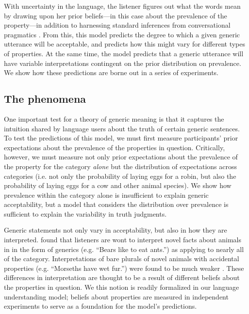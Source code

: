 \documentclass[10pt,letterpaper]{article}
\begin{document}
With uncertainty in the language, the listener figures out what the words mean by drawing upon her prior beliefs---in this case about the prevalence of the property---in addition to harnessing standard inferences from conversational pragmatics \cite{Clark1996, Grice1975, Levinson2000}. From this, this model predicts the degree to which a given generic utterance will be acceptable, and predicts how this might vary for different types of properties. At the same time, the model predicts that a generic utterance will have variable interpretations contingent on the prior distribution on prevalence. 
We show how these predictions are borne out in a series of experiments.
%
\subsection{The phenomena}

One important test for a theory of generic meaning is that it captures the intuition shared by language users about the truth of certain generic sentences. To test the predictions of this model, we must first measure participants' prior expectations about the prevalence of the properties in question. Critically, however, we must measure not only prior expectations about the prevalence of the property for the category \emph{alone} but the distribution of expectations across categories (i.e. not only the probability of laying eggs for a robin, but also the probability of laying eggs for a cow and other animal species).  
We show how prevalence within the category alone is insufficient to explain generic acceptability, but a model that considers the distribution over prevalence is sufficient to explain the variability in truth judgments.

Generic statements not only vary in acceptability, but also in how they are interpreted.  found that listeners are wont to interpret novel facts about animals in in the form of generics (e.g. ``Bears like to eat ants.'') as applying to nearly all of the category. Interpretations of bare plurals of novel animals with accidental properties (e.g. ``Morseths have wet fur.'') were found to be much weaker \cite{Cimpian2010}. These differences in interpretation are thought to be a result of different beliefs about the properties in question. We this notion is readily formalized in our language understanding model; beliefs about properties are measured in independent experiments to serve as a foundation for the model's predictions.
\end{document}
